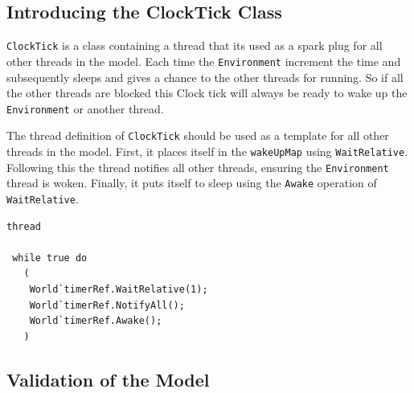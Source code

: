 \documentclass{overturerepchap}
\begin{document}




\subsection{Introducing the ClockTick Class}

\texttt{ClockTick} is a class containing a thread that its used as a spark plug
for all other threads in the model. Each time the \texttt{Environment}
increment the time and subsequently sleeps and gives a chance to the
other threads for running. So if all the other threads are blocked
this Clock tick will always be ready to wake up the \texttt{Environment} or 
another thread.

%
%
%
%
%
%

The thread definition of \texttt{ClockTick} should be used as a template
for all other threads in the model. First, it places itself in the \texttt{wakeUpMap} 
using \texttt{WaitRelative}. Following this the thread notifies all other threads, ensuring 
the \texttt{Environment} thread is woken. Finally, it puts itself to sleep using the
\texttt{Awake} operation of \texttt{WaitRelative}.

\begin{lstlisting}
thread

 while true do
   (
    World`timerRef.WaitRelative(1);
    World`timerRef.NotifyAll();
    World`timerRef.Awake();
   )
\end{lstlisting}

\subsection{Validation of the Model}
\end{document}
